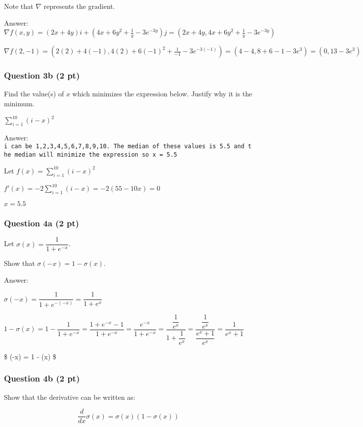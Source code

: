 \documentclass[11pt]{article}
\begin{document}
Note that \(\nabla\) represents the gradient.

    Answer:
\(\nabla f(x, y) = (2x + 4y)i + (4x + 6y^2 + \frac{1}{y} - 3e^{-3y})j = (2x + 4y, 4x + 6y^2 + \frac{1}{y} - 3e^{-3y})\)

\(\nabla f(2, -1) = (2(2) + 4(-1), 4(2) + 6(-1)^2 + \frac{1}{-1} - 3e^{-3(-1)}) = (4 - 4, 8 + 6 - 1 - 3e^3) = (0, 13-3e^3)\)

    \subsubsection{Question 3b (2 pt)}\label{question-3b-2-pt}

Find the value(s) of \(x\) which minimizes the expression below. Justify
why it is the minimum.

\(\sum_{i=1}^{10} (i - x)^2\)

    Answer:
\texttt{i\ can\ be\ 1,2,3,4,5,6,7,8,9,10.\ The\ median\ of\ these\ values\ is\ 5.5\ and\ the\ median\ will\ minimize\ the\ expression\ so\ x\ =\ 5.5}

Let \(f(x) = \sum_{i=1}^{10} (i - x)^2\)

\(f'(x) = -2\sum_{i=1}^{10} (i - x) = -2(55 - 10x) = 0\)

\(x = 5.5\)

    \subsubsection{Question 4a (2 pt)}\label{question-4a-2-pt}

Let \(\sigma(x) = \dfrac{1}{1+e^{-x}}\).

Show that \(\sigma(-x) = 1 - \sigma(x)\).

    Answer:

\(\sigma(-x) = \dfrac{1}{1+e^{-(-x)}} = \dfrac{1}{1+e^{x}}\)

\(1 - \sigma(x) = 1 - \dfrac{1}{1+e^{-x}} = \dfrac{1+e^{-x}-1}{1+e^{-x}} = \dfrac{e^{-x}}{1+e^{-x}} = \dfrac{\dfrac{1}{e^x}}{1+\dfrac{1}{e^x}} = \dfrac{\dfrac{1}{e^x}}{\dfrac{e^x+1}{e^x}} = \dfrac{1}{e^x+1}\)

\$ \sigma(-x) = 1 - \sigma(x) \$

    \subsubsection{Question 4b (2 pt)}\label{question-4b-2-pt}

Show that the derivative can be written as:

\[\frac{d}{dx}\sigma(x) = \sigma(x)(1 - \sigma(x))\]
\end{document}
